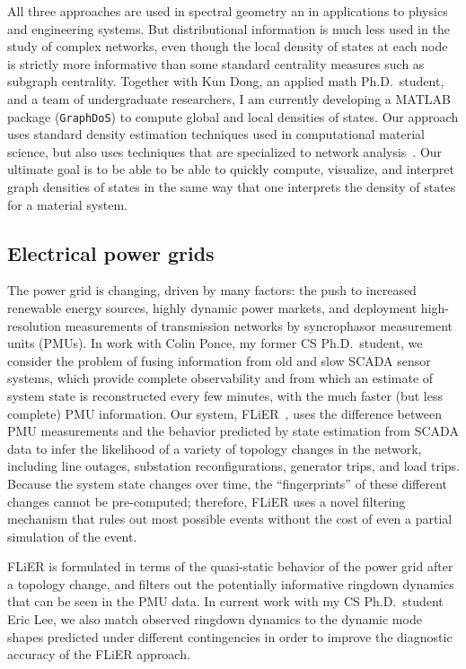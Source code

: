 \documentclass[11pt]{amsart}
\begin{document}
All three approaches are used in spectral geometry an in applications to
physics and engineering systems.  But distributional information is much
less used in the study of complex networks, even though the local
density of states at each node is strictly more informative than
some standard centrality measures such as subgraph centrality.
Together with Kun Dong, an applied math Ph.D.~student, and a team of
undergraduate researchers, I am currently developing a MATLAB package
({\tt GraphDoS}) to compute global and local densities of states.
Our approach uses standard density estimation techniques used in
computational material science, but also uses techniques that are
specialized to network analysis~\cite{2015-siam-ns}.  Our ultimate
goal is to be able to be able to quickly compute, visualize, and
interpret graph densities of states in the same
way that one interprets the density of states for a material system.

\subsection*{Electrical power grids}


The power grid is changing, driven by many factors: the push to
increased renewable energy sources, highly dynamic power markets, and
deployment high-resolution measurements of transmission networks by
syncrophasor measurement units (PMUs).  In work with Colin Ponce,
my former CS Ph.D.~student, we consider the problem of fusing information
from old and slow SCADA sensor systems, which provide complete
observability and from which an estimate of system state is
reconstructed every few minutes, with the much faster (but less
complete) PMU information.  Our system, FLiER~\cite{2016-flier-tr},
uses the difference between PMU measurements and the
behavior predicted by state estimation from SCADA data to infer
the likelihood of a variety of topology changes in the network,
including line outages, substation reconfigurations, generator
trips, and load trips.  Because the system state changes over
time, the ``fingerprints'' of these different changes cannot be
pre-computed; therefore, FLiER uses a novel filtering mechanism
that rules out most possible events without
the cost of even a partial simulation of the event.

FLiER is formulated in terms of the quasi-static behavior of the
power grid after a topology change, and filters out the potentially
informative ringdown dynamics that can be seen in the PMU data.  In
current work with my CS Ph.D.~student Eric Lee, we also match observed
ringdown dynamics to the dynamic mode shapes predicted under different
contingencies in order to improve the diagnostic accuracy of the FLiER
approach.
\end{document}

